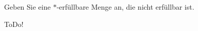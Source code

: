 
\begin{exercise}[26]

Geben Sie eine $\ast$-erfüllbare Menge an, die nicht erfüllbar ist.

\end{exercise}


\begin{solution}

ToDo!

\end{solution}

